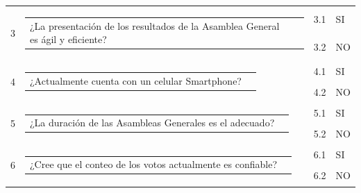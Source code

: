 \begin{longtable}{|l|l|l|l|}
		\hline
		\multirow{2}{*}{3}                          & \multirow{2}{*}{\begin{tabular}[c]{p{9cm}@{}l@{}}¿La presentación de los resultados de la Asamblea General es ágil y eficiente? \end{tabular}}                                                 & 3.1              & SI                  \\ 
		\cline{3-4}
		&                                                                                                                                                                                            & 3.2              & NO                  \\ 
		\hline
		\multirow{2}{*}{4}                          & \multirow{2}{*}{\begin{tabular}[c]{p{9cm}@{}l@{}}¿Actualmente cuenta con un celular Smartphone? \end{tabular}}                                                                                 & 4.1              & SI                  \\ 
		\cline{3-4}
		&                                                                                                                                                                                            & 4.2              & NO                  \\ 
		\hline
		\multirow{2}{*}{5}                          & \multirow{2}{*}{\begin{tabular}[c]{p{9cm}@{}l@{}}¿La duración de las Asambleas Generales es el adecuado? \end{tabular}}                                                                        & 5.1              & SI                  \\ 
		\cline{3-4}
		&                                                                                                                                                                                            & 5.2              & NO                  \\ 
		\hline
		\multirow{2}{*}{6}                          & \multirow{2}{*}{\begin{tabular}[c]{p{9cm}@{}l@{}}¿Cree que el conteo de los votos actualmente es confiable? \end{tabular}}                                                                     & 6.1              & SI                  \\ 
		\cline{3-4}
		&                                                                                                                                                                                            & 6.2              & NO                  \\ 

\end{longtable}
